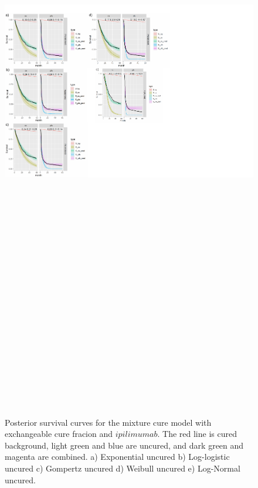 \documentclass[
]{article}
\begin{document}
\begin{figure}

{\centering \includegraphics[width=25cm,height=40cm]{Check_mate_analysis_files/figure-latex/unnamed-chunk-8-1} 

}

\caption{\label{fig:IPI}Posterior survival curves for the mixture cure model with exchangeable cure fracion and $ipilimumab$. The red line is cured background, light green and blue are uncured, and dark green and magenta are combined. a) Exponential uncured b) Log-logistic uncured c) Gompertz uncured d) Weibull uncured e) Log-Normal uncured.}\label{fig:unnamed-chunk-8}
\end{figure}
\end{document}
